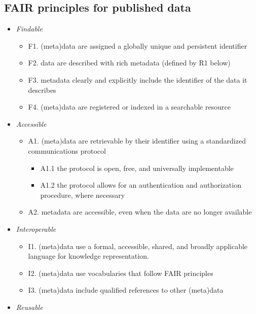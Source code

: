 \documentclass[
]{article}
\providecommand{\tightlist}{%
  \setlength{\itemsep}{0pt}\setlength{\parskip}{0pt}}
\begin{document}
\hypertarget{fair-principles-for-published-data}{%
\subsection{FAIR principles for published data}\label{fair-principles-for-published-data}}

\begin{itemize}
\tightlist
\item
  \emph{Findable}

  \begin{itemize}
  \tightlist
  \item
    F1. (meta)data are assigned a globally unique and persistent identifier
  \item
    F2. data are described with rich metadata (defined by R1 below)
  \item
    F3. metadata clearly and explicitly include the identifier of the data it describes
  \item
    F4. (meta)data are registered or indexed in a searchable resource
  \end{itemize}
\item
  \emph{Accessible}

  \begin{itemize}
  \tightlist
  \item
    A1. (meta)data are retrievable by their identifier using a standardized communications protocol

    \begin{itemize}
    \tightlist
    \item
      A1.1 the protocol is open, free, and universally implementable
    \item
      A1.2 the protocol allows for an authentication and authorization procedure, where necessary
    \end{itemize}
  \item
    A2. metadata are accessible, even when the data are no longer available
  \end{itemize}
\item
  \emph{Interoperable}

  \begin{itemize}
  \tightlist
  \item
    I1. (meta)data use a formal, accessible, shared, and broadly applicable language for knowledge representation.
  \item
    I2. (meta)data use vocabularies that follow FAIR principles
  \item
    I3. (meta)data include qualified references to other (meta)data
  \end{itemize}
\item
  \emph{Reusable}


\end{itemize}
\end{document}
